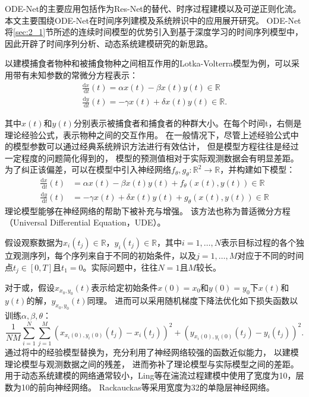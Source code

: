 ODE-Net的主要应用包括作为Res-Net的替代、时序过程建模以及可逆正则化流\cite{Grathwohl2019}。本文主要围绕ODE-Net在时间序列建模及系统辨识中的应用展开研究。
ODE-Net将\ref{sec:2_1}节所述的连续时间模型的优势引入到基于深度学习的时间序列模型中，因此开辟了时间序列分析、动态系统建模研究的新思路。

以建模捕食者物种和被捕食物种之间相互作用的Lotka-Volterra模型为例，可以采用带有未知参数的常微分方程表示：
\begin{equation}
    \begin{gathered}
    \frac{\mathrm{d} x}{\mathrm{~d} t}(t)=\alpha x(t)-\beta x(t) y(t) \in \mathbb{R} \\
    \frac{\mathrm{d} y}{\mathrm{~d} t}(t)=-\gamma x(t)+\delta x(t) y(t) \in \mathbb{R} .
    \end{gathered}
    \label{equ:2_ode}
\end{equation}

其中$x(t)$和$y(t)$分别表示被捕食者和捕食者的种群大小。在每个时间t，右侧是理论经验公式，表示物种之间的交互作用。
在一般情况下，尽管上述经验公式中的模型参数可以通过经典系统辨识方法进行有效估计，
但是模型方程往往是经过一定程度的问题简化得到的，
模型的预测值相对于实际观测数据会有明显差距。
为了纠正该偏差，可以在模型中引入神经网络$f_\theta, g_\theta: \mathbb{R}^2 \rightarrow \mathbb{R}$，并构建如下模型：
\begin{equation}
    \begin{aligned}
    \frac{\mathrm{d} x}{\mathrm{~d} t}(t) &=\alpha x(t)-\beta x(t) y(t)+f_\theta(x(t), y(t)) \in \mathbb{R} \\
    \frac{\mathrm{d} y}{\mathrm{~d} t}(t) &=-\gamma x(t)+\delta x(t) y(t)+g_\theta(x(t), y(t)) \in \mathbb{R}
    \end{aligned}
    \label{equ:2_node}
\end{equation}
理论模型能够在神经网络的帮助下被补充与增强。
该方法也称为普适微分方程（Universal Differential Equation，UDE）\cite{rackauckas2020universal}。

假设观察数据为$x_i\left(t_j\right) \in \mathbb{R}$，$ y_i\left(t_j\right) \in \mathbb{R}$，其中$i=1, \ldots, N$表示目标过程的各个独立观测序列，每个序列来自于不同的初始条件，以及$j=1, \ldots, M$对应于不同的时间点$t_j \in[0, T]$且$t_1=0$。实际问题中，往往$N=1$且$M$较长。

对于或，假设$x_{x_0, y_0}(t)$表示给定初始条件$x(0)=x_0$和$y(0)=y_0$下$x(t)$和$y(t)$的解，$y_{x_0, y_0}(t)$同理。
进而可以采用随机梯度下降法优化如下损失函数以训练$\alpha,\beta,\theta$：
\begin{equation}
    \frac{1}{N M} \sum_{i=1}^N \sum_{j=1}^M\left(x_{x_i(0), y_i(0)}\left(t_j\right)-x_i\left(t_j\right)\right)^2+\left(y_{x_i(0), y_i(0)}\left(t_j\right)-y_i\left(t_j\right)\right)^2 .
\end{equation}
通过将中的经验模型替换为，充分利用了神经网络较强的函数近似能力，
以建模理论模型与观测数据之间的残差，
进而弥补了理论模型与实际模型之间的差距。
用于动态系统建模的网络通常较小，Ling等\cite{ling2016reynolds}在湍流过程建模中使用了宽度为10，层数为10的前向神经网络。
Rackauckas等\cite{rackauckas2020universal}采用宽度为32的单隐层神经网络。

